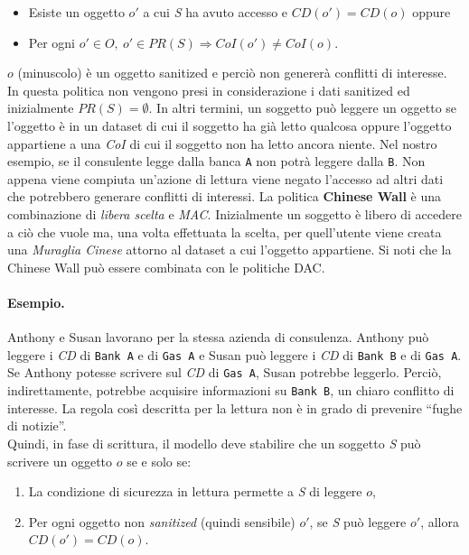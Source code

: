 \begin{itemize}
      \item Esiste un oggetto \(o'\) a cui \textit{S} ha avuto accesso e
            \(CD(o') = CD(o)\) oppure
      \item Per ogni \(o' \in O, \ o' \in PR(S) \Rightarrow CoI(o') \neq CoI(o)\).
\end{itemize}

\(o\) (minuscolo) è un oggetto sanitized e perciò non genererà conflitti di
interesse.
In questa politica non vengono presi in considerazione i dati sanitized ed
inizialmente \(PR(S) = \emptyset \).
In altri termini, un soggetto può leggere un oggetto se l'oggetto è in un dataset
di cui il soggetto ha
già letto qualcosa oppure l'oggetto appartiene a una \textit{CoI} di cui il
soggetto non ha letto ancora niente. Nel nostro esempio, se il consulente legge
dalla banca \verb|A| non potrà leggere dalla \verb|B|. Non
appena viene compiuta un'azione di lettura viene negato l'accesso ad altri dati
che potrebbero generare conflitti di interessi.
La politica \textbf{Chinese Wall} è una combinazione di \textit{libera scelta} e
\textit{MAC}. Inizialmente un soggetto è
libero di accedere a ciò che vuole ma, una volta effettuata la scelta, per
quell'utente viene creata una \textit{Muraglia Cinese} attorno al dataset a cui
l'oggetto appartiene.
Si noti che la Chinese Wall può essere combinata con le politiche DAC.

\paragraph{Esempio.}
Anthony e Susan lavorano per la stessa azienda di consulenza.
Anthony può leggere i \textit{CD} di \verb|Bank A| e di \verb|Gas A| e Susan
può leggere i \textit{CD} di \verb|Bank B| e di \verb|Gas A|. Se Anthony potesse
scrivere sul \textit{CD} di \verb|Gas A|, Susan potrebbe leggerlo. Perciò,
indirettamente, potrebbe acquisire informazioni su
\verb|Bank B|, un chiaro conflitto di interesse. La regola così descritta per la
lettura non è in grado di prevenire “fughe di notizie”.\\

Quindi, in fase di scrittura, il modello deve stabilire che un soggetto \textit{S}
può scrivere un oggetto \(o\) se e solo se:

\begin{enumerate}
      \item La condizione di sicurezza in lettura permette a \textit{S} di
            leggere \(o\),
      \item Per ogni oggetto non \textit{sanitized} (quindi sensibile) \(o'\),
            se \textit{S} può leggere \(o'\), allora \(CD(o') = CD(o)\).
\end{enumerate}

